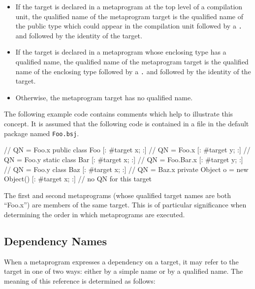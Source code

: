 \documentclass[a4paper,10pt]{report}
\newenvironment{code}{\small\verbatim}{\endverbatim}
\begin{document}
\begin{itemize}
    \item If the target is declared in a metaprogram at the top level of a compilation unit, the qualified name of the metaprogram target is the qualified name of the public type which could appear in the compilation unit followed by a \verb`.` and followed by the identity of the target.
    \item If the target is declared in a metaprogram whose enclosing type has a qualified name, the qualified name of the metaprogram target is the qualified name of the enclosing type followed by a \verb`.` and followed by the identity of the target.
    \item Otherwise, the metaprogram target has no qualified name.
\end{itemize}

The following example code contains comments which help to illustrate this concept.  It is assumed that the following code is contained in a file in the default package named \verb`Foo.bsj`.

\begin{code}
    [: #target x; :] // QN = Foo.x
    public class Foo {
        [: #target x; :] // QN = Foo.x
        [: #target y; :] // QN = Foo.y
        static class Bar {
            [: #target x; :] // QN = Foo.Bar.x
        }
    }
    [: #target y; :] // QN = Foo.y
    class Baz {
        [: #target x; :] // QN = Baz.x
        private Object o = new Object() {
            [: #target x; :] // no QN for this target
        }
    }
\end{code}

The first and second metaprograms (whose qualified target names are both ``Foo.x'') are members of the same target.  This is of particular significance when determining the order in which metaprograms are executed.

\subsection{Dependency Names}
\label{secMetaprogNamesDepnames}

When a metaprogram expresses a dependency on a target, it may refer to the target in one of two ways: either by a simple name or by a qualified name.  The meaning of this reference is determined as follows:
\end{document}
